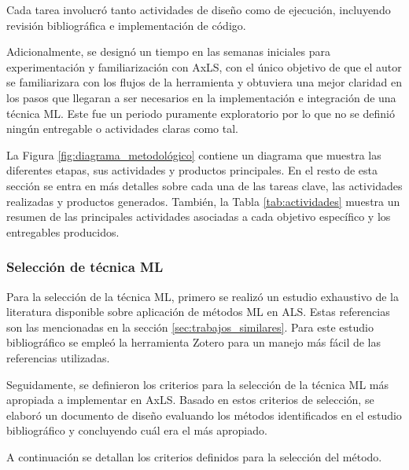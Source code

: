 Cada tarea involucró tanto actividades de diseño como de ejecución, incluyendo
revisión bibliográfica e implementación de código.

Adicionalmente, se designó un tiempo en las semanas iniciales para
experimentación y familiarización con AxLS, con el único objetivo de que el
autor se familiarizara con los flujos de la herramienta y obtuviera una mejor
claridad en los pasos que llegaran a ser necesarios en la implementación e
integración de una técnica ML.
Este fue un periodo puramente exploratorio por lo que no se definió ningún
entregable o actividades claras como tal.


La Figura \ref{fig:diagrama_metodológico} contiene un diagrama que muestra las
diferentes etapas, sus actividades y productos principales.
En el resto de esta sección se entra en más detalles sobre cada una de las tareas clave, las
actividades realizadas y productos generados.
También, la Tabla \ref{tab:actividades} muestra un resumen de las principales actividades asociadas a
cada objetivo específico y los entregables producidos.

\subsubsection{Selección de técnica ML}
\label{sec:seleccion_ml}

Para la selección de la técnica ML, primero se realizó un estudio exhaustivo
de la literatura disponible sobre aplicación de métodos ML en ALS. Estas
referencias son las mencionadas en la sección \ref{sec:trabajos_similares}.
Para este estudio bibliográfico se empleó la herramienta Zotero para un manejo
más fácil de las referencias utilizadas.

Seguidamente, se definieron los criterios para la selección de la técnica ML
más apropiada a implementar en AxLS. Basado en estos criterios de selección, se
elaboró un documento de diseño evaluando los métodos identificados en el
estudio bibliográfico y concluyendo cuál era el más apropiado.

A continuación se detallan los criterios definidos para la selección del método.

